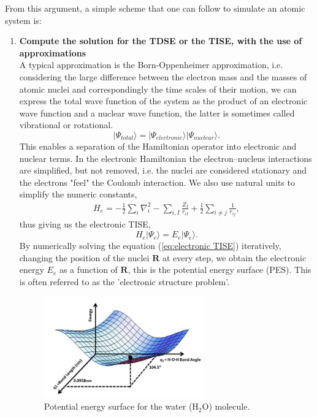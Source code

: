From this argument, a simple scheme that one can follow to simulate an atomic system is:
\begin{enumerate}
  \item \textbf{Compute the solution for the TDSE or the TISE, with the use of approximations} \\
  A typical approximation is the Born-Oppenheimer approximation, i.e. considering the large difference between the electron mass and the masses of atomic nuclei and correspondingly the time scales of their motion, we can express the total wave function of the system as the product of an electronic wave function and a nuclear wave function, the latter is sometimes called vibrational or rotational.
  \begin{equation}
      |\Psi_{total}\rangle = |\Psi_{electronic}\rangle |\Psi_{nuclear}\rangle.
  \end{equation}
  This enables a separation of the Hamiltonian operator into electronic and nuclear terms. In the electronic Hamiltonian the electron–nucleus interactions are simplified, but not removed, i.e. the nuclei are considered stationary and the electrons "feel" the Coulomb interaction. We also use natural units to simplify the numeric constants,
  \begin{equation}\begin{split}
     H_e = -\frac12\sum_{i} \nabla^2_i
              -\sum_{i,I} \frac{Z_I}{r_{iI}}
              +\frac12 \sum_{i \neq j} \frac{1}{r_{ij}},
  \label{eq:electronic hamiltonian}
  \end{split}\end{equation}
  thus giving us the electronic TISE,
  \begin{equation}
    H_e |\Psi_e\rangle = E_e |\Psi_e\rangle.
  \label{eq:electronic TISE}
  \end{equation}
  By numerically solving the equation (\ref{eq:electronic TISE}) iteratively, changing the position of the nuclei $\textbf{R}$ at every step, we obtain the electronic energy $E_e$ as a function of $\textbf{R}$, this is the potential energy surface (PES). This is often referred to as the 'electronic structure problem'.
  
  \begin{figure}[ht]
  \centering
  \includegraphics[width=0.65\textwidth]{figures/Potential_Energy_Surface_for_Water.png}
  \caption{Potential energy surface for the water (H$_2$O) molecule.}
  \end{figure}
  

\end{enumerate}
